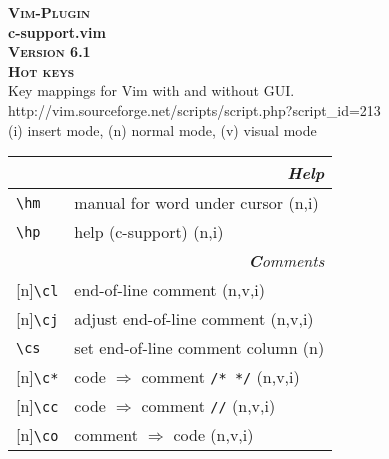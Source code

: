 \documentclass[oneside,11pt,landscape,DIV16]{scrartcl}
\newcommand{\Pluginversion}{6.1}
\newcommand{\Rep}{{\tiny{[n]}}}
\begin{document}
%
%
\begin{multicols}{3}
%
\begin{center}
\textbf{\textsc{\small{Vim-Plugin}}}\\
\textbf{\LARGE{c-support.vim}}\\
\textbf{\textsc{\small{Version \Pluginversion}}}\\
\textbf{\textsc{\Huge{Hot keys}}}\\ 
Key mappings for Vim with and without GUI.\\
{\tiny{http://vim.sourceforge.net/scripts/script.php?script\_id=213}}\\
\vspace{3.0mm}
{\normalsize (i)} insert mode, {\normalsize (n)} normal mode, {\normalsize (v)} visual mode\\
\vspace{5.0mm}
%
\begin{tabular}[]{|p{10mm}|p{60mm}|}
\hline 
\multicolumn{2}{|r|}{\textsl{\textbf{H}elp}}\\
\hline \verb'\hm'   & manual for word under cursor  \hfill (n,i)\\
\hline \verb'\hp'   & help (c-support) \hfill (n,i)\\
\hline 
%
\hline
\multicolumn{2}{|r|}{\textsl{\textbf{C}omments}} \\
\hline \Rep\verb'\cl'  & end-of-line comment                     \hfill (n,v,i)\\
\hline \Rep\verb'\cj'  & adjust end-of-line comment              \hfill (n,v,i)\\
\hline     \verb'\cs'  & set end-of-line comment column          \hfill (n)    \\
\hline \Rep\verb'\c*'  & code $\Rightarrow$ comment \verb'/* */' \hfill (n,v,i)  \\
\hline \Rep\verb'\cc'  & code $\Rightarrow$ comment \verb'//'    \hfill (n,v,i)\\
\hline \Rep\verb'\co'  & comment $\Rightarrow$ code              \hfill (n,v,i)\\

\end{tabular}
\end{center}
\end{multicols}
\end{document}
